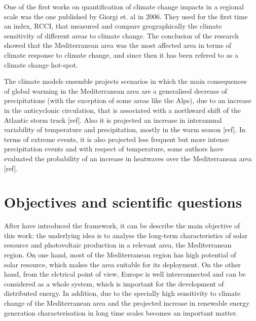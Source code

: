 One of the first works on quantification of climate change impacts in a regional scale was the one published by Giorgi et. al in 2006. They used for the first time an index, RCCI, that measured and compare geographically the climate sensitivity of different areas to climate change. The conclusion of the research showed that the Mediterranean area was the most affected area in terms of climate response to climate change, and since then it has been refered to as a climate change hot-spot.


The climate models ensemble projects scenarios in which the main consequences of global warming in the Mediterranean area are a generalised decrease of precipitations (with the exception of some areas like the Alps), due to an increase in the anticyclonic circulation, that is associated with a northward shift of the Atlantic storm track [ref]. Also it is projected an increase in interannual variability of temperature and precipitation, mostly in the warm season [ref]. In terms of extreme events, it is also projected less frequent but more intense precipitation events and with respect of temperature, some authors have evaluated the probability of an increase in heatwaves over the Mediterranean area [ref].   

\section{Objectives and scientific questions}%


After have introduced the framework, it can be describe the main objective of this work: the underlying idea is to analyse the long-term characteristics of solar resource and photovoltaic production in a relevant area, the Mediterranean region. On one hand, most of the Mediterranean region has high potential of solar resource, which makes the area suitable for its deployment. On the other hand, from the elctrical point of view, Europe is well interconnected and can be considered as a whole system, which is important for the development of distributed energy. In addition, due to the specially high sensitivity to climate change of the Mediterranean area and the projected increase in renewable energy generation characterisation in long time scales becomes an important matter.

